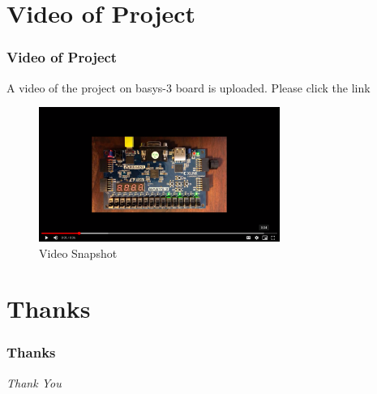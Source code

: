 \documentclass{beamer}
\begin{document}
\section{Video of Project}
\begin{frame}
\frametitle{Video of Project}
A video of the project on basys-3 board is uploaded. Please click the link 
\href{https://drive.google.com/file/d/1TnwBi27fA0xLse6_bEnivC6h0F47zUzk/view?usp=sharing}{ }
\begin{figure}
\includegraphics[width=0.7\textwidth,height=0.6\textheight] {../diagram/video_snapshot.png}
\caption{Video Snapshot}
\end{figure}
\end{frame}



\section{Thanks}
\begin{frame}
\frametitle{Thanks}
\centering \Huge
  \emph{Thank You}
\end{frame}
\end{document}
